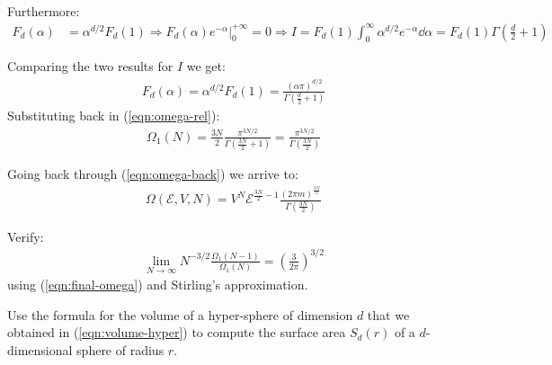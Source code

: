 \documentclass[../../main.tex]{subfiles}
\begin{document}
Furthermore:
\begin{align*}
    F_d(\alpha) &= \alpha^{d/2} F_d(1) \Rightarrow F_d(\alpha) e^{-\alpha} \Big|_{0}^{+\infty} = 0 \Rightarrow I= F_d(1) \int_0^{\infty} \alpha^{d/2} e^{-\alpha} \dd{\alpha} = F_d(1) \Gamma\left(\frac{d}{2} +1 \right)
\end{align*}

Comparing the two results for $I$ we get:
\begin{align} \label{eqn:volume-hyper}
    F_d(\alpha) = \alpha^{d/2} F_d(1) = \frac{(\alpha \pi)^{d/2}}{\Gamma\left(\frac{d}{2}+1 \right)}
\end{align}
Substituting back in (\ref{eqn:omega-rel}):
\begin{align*}
    \Omega_1(N) = \frac{3N}{2} \frac{\pi^{3N/2}}{\Gamma\left(\frac{3N}{2}+1 \right)}  = \frac{\pi^{3N/2}}{\Gamma\left(\frac{3N}{2} \right)} 
\end{align*}

Going back through (\ref{eqn:omega-back}) we arrive to:
\begin{align}\label{eqn:final-omega}
    \Omega(\mathcal{E}, V, N) =  V^N \mathcal{E}^{\frac{3N}{2} -1 } \frac{(2 \pi m)^{\frac{3N}{2} }}{\Gamma\left(\frac{3N}{2} \right)} 
\end{align}

\begin{exo}[Verifications]
    Verify:
    \begin{align*}
        \lim_{N \to \infty} N^{-3/2} \frac{\Omega_1(N-1)}{\Omega_1(N)}  = \left(\frac{3}{2 \pi} \right)^{3/2}
    \end{align*}
    using (\ref{eqn:final-omega}) and Stirling's approximation.
\end{exo}

\begin{exo}
    Use the formula for the volume of a hyper-sphere of dimension $d$ that we obtained in (\ref{eqn:volume-hyper}) to compute the surface area $S_d(r)$ of a $d$-dimensional sphere of radius $r$.
\end{exo}
\end{document}
